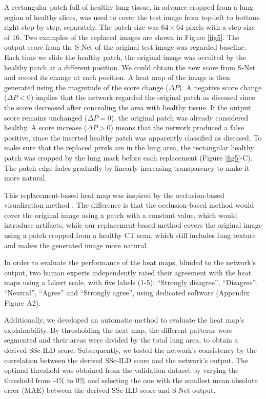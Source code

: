A rectangular patch full of healthy lung tissue, in advance cropped from a lung region of healthy slices, was used to cover the test image from top-left to bottom-right step-by-step, separately. The patch size was $64 \times 64$ pixels with a step size of 16. Two examples of the replaced images are shown in Figure \ref{fig5}.  The output score from the S-Net of the original test image was regarded baseline. Each time we slide the healthy patch, the original image was occulted by the healthy patch at a different position. We could obtain the new score from S-Net and record its change at each position. A heat map of the image is then generated using the magnitude of the score change ($\Delta P$). A negative score change ($\Delta P<0$) implies that the network regarded the original patch as diseased since the score decreased after concealing the area with healthy tissue. If the output score remains unchanged ($\Delta P=0$), the original patch was already considered healthy. A score increase ($\Delta P>0$) means that the network produced a false positive, since the inserted healthy patch was apparently classified as diseased. To make sure that the replaced pixels are in the lung area, the rectangular healthy patch was cropped by the lung mask before each replacement (Figure \ref{fig5}-C). The patch edge fades gradually by linearly increasing transparency to make it more natural.

This replacement-based heat map was inspired by the occlusion-based visualization method \cite{zeiler2014visualizing}. The difference is that the occlusion-based method would cover the original image using a patch with a constant value, which would introduce artifacts, while our replacement-based method covers the original image using a patch cropped from a healthy CT scan, which still includes lung texture and makes the generated image more natural. 

In order to evaluate the performance of the heat maps, blinded to the network’s output, two human experts independently rated their agreement with the heat maps using a Likert scale, with five labels (1-5): “Strongly disagree”, “Disagree”, “Neutral”, “Agree” and “Strongly agree”, using dedicated software (Appendix Figure A2).

Additionally, we developed an automatic method to evaluate the heat map’s explainability. By thresholding the heat map, the different patterns were segmented and their areas were divided by the total lung area, to obtain a derived SSc-ILD score. Subsequently, we tested the network’s consistency by the correlation between the derived SSc-ILD score and the network’s output. The optimal threshold was obtained from the validation dataset by varying the threshold from -4\% to 0\% and selecting the one with the smallest mean absolute error (MAE) between the derived SSc-ILD score and S-Net output.

